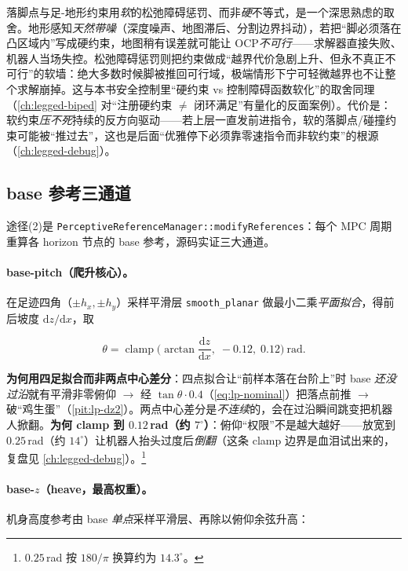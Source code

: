 \begin{insight}\label{ins:lp-soft-why}
落脚点与足-地形约束用\emph{软}的松弛障碍惩罚、而非\emph{硬}不等式，是一个深思熟虑的取舍。地形感知\emph{天然带噪}（深度噪声、地图滞后、分割边界抖动），若把“脚必须落在凸区域内”写成硬约束，地图稍有误差就可能让 OCP\emph{不可行}——求解器直接失败、机器人当场失控。松弛障碍惩罚则把约束做成“越界代价急剧上升、但永不真正不可行”的软墙：绝大多数时候脚被推回可行域，极端情形下宁可轻微越界也不让整个求解崩掉。这与本书安全控制里“硬约束 vs 控制障碍函数软化”的取舍同理（\cref{ch:legged-biped} 对“注册硬约束 $\ne$ 闭环满足”有量化的反面案例）。代价是：软约束\emph{压不死}持续的反方向驱动——若上层一直发前进指令，软的落脚点/碰撞约束可能被“推过去”，这也是后面“优雅停下必须靠零速指令而非软约束”的根源（\cref{ch:legged-debug}）。
\end{insight}

\subsection{base 参考三通道}
\label{subsec:lp-baseref}

途径(2)是 \texttt{PerceptiveReferenceManager::modifyReferences}：每个 MPC 周期重算各 horizon 节点的 base 参考，源码实证三大通道。

\paragraph{base-pitch（爬升核心）。}
在足迹四角（$\pm h_x,\pm h_y$）采样平滑层 \texttt{smooth\_planar} 做最小二乘\emph{平面拟合}，得前后坡度 $\mathrm{d}z/\mathrm{d}x$，取

\begin{equation}
  \theta = \operatorname{clamp}\!\Big(\arctan\frac{\mathrm{d}z}{\mathrm{d}x},\; -0.12,\; 0.12\Big)\ \text{rad}.
  \label{eq:lp-pitch}
\end{equation}

\textbf{为何用四足拟合而非两点中心差分}：四点拟合让“前样本落在台阶上”时 base \emph{还没过沿}就有平滑非零俯仰 $\to$ 经 $\tan\theta\cdot 0.4$（\cref{eq:lp-nominal}）把落点前推 $\to$ 破“鸡生蛋”（\cref{pit:lp-dz2}）。两点中心差分是\emph{不连续}的，会在过沿瞬间跳变把机器人掀翻。\textbf{为何 clamp 到 $0.12\,$rad（约 $7^\circ$）}：俯仰“权限”不是越大越好——放宽到 $0.25\,$rad（约 $14^\circ$）让机器人抬头过度后\emph{倒翻}（这条 clamp 边界是血泪试出来的，复盘见 \cref{ch:legged-debug}）。\footnote{$0.25\,$rad 按 $180/\pi$ 换算约为 $14.3^\circ$。}

\paragraph{base-$z$（heave，最高权重）。}
机身高度参考由 base \emph{单点}采样平滑层、再除以俯仰余弦升高：


